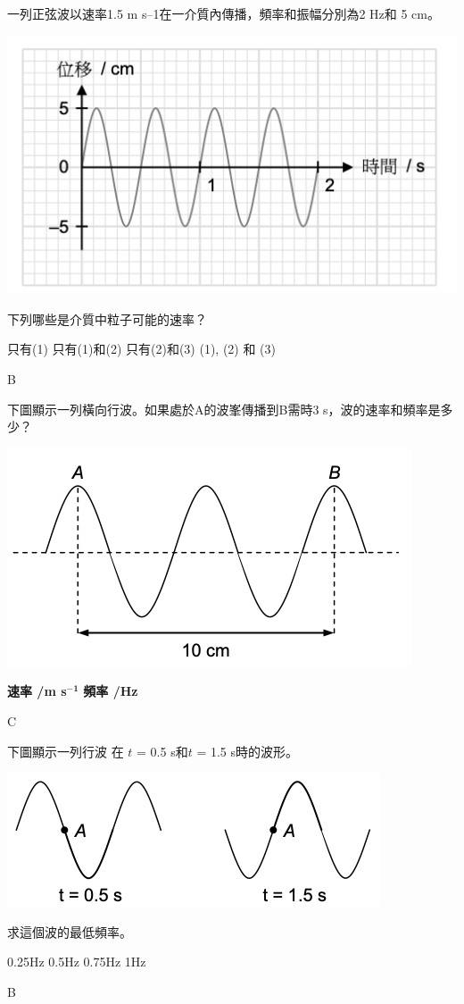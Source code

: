 {
    一列正弦波以速率1.5 m s–1在一介質內傳播，頻率和振幅分別為2 Hz和
    5 cm。
    \par{\par\centering\includegraphics[width=.4\textwidth]{./img/ch1_earlyclass_wave_mc_2024-05-13-16-04-17.png}\par}
    下列哪些是介質中粒子可能的速率？
    \begin{statements}
        \task {}
        \task {}
    \end{statements}
    \begin{tasks}
        \task 只有(1)
        \task 只有(1)和(2)
        \task 只有(2)和(3)
        \task (1), (2) 和 (3)
    \end{tasks}
}{B}

{
    下圖顯示一列橫向行波。如果處於A的波峯傳播到B需時3 s，波的速率和頻率是多少？
    \par{\par\centering\includegraphics[width=.4\textwidth]{./img/ch1_earlyclass_wave_mc_2024-05-13-16-05-45.png}\par}
    \begin{tasks}
        \task [] \textbf{速率 /m s}$\mathbf{^{-1}}$ \tab\tab \textbf{頻率 /Hz}
         \tab{}
         \tab{}
         \tab{}
         \tab{}
    \end{tasks}

}{C}

{
    下圖顯示一列行波 在 $t$ = 0.5 s和$t$ = 1.5 s時的波形。
    \par{\par\centering\includegraphics[width=.4\textwidth]{./img/ch1_earlyclass_wave_mc_2024-05-13-16-11-35.png}\par}
    求這個波的最低頻率。
    \begin{tasks}
        \task 0.25Hz
        \task 0.5Hz
        \task 0.75Hz
        \task 1Hz
    \end{tasks}

}{B}

